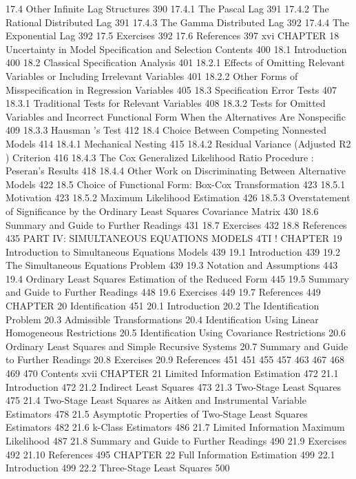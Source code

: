{17.4 Other Infinite Lag Structures 390
17.4.1 The Pascal Lag 391
17.4.2 The Rational Distributed Lag 391
17.4.3 The Gamma Distributed Lag 392
17.4.4 The Exponential Lag 392
17.5 Exercises 392
17.6 References 397
xvi
CHAPTER 18
Uncertainty in Model Specification and Selection
Contents
400
18.1 Introduction 400
18.2 Classical Specification Analysis 401
18.2.1 Effects of Omitting Relevant Variables or Including Irrelevant Variables 401
18.2.2 Other Forms of Misspecification in Regression Variables 405
18.3 Specification Error Tests 407
18.3.1 Traditional Tests for Relevant Variables 408
18.3.2 Tests for Omitted Variables and Incorrect Functional Form When the
Alternatives Are Nonspecific 409
18.3.3 Hausman 's Test 412
18.4 Choice Between Competing Nonnested Models 414
18.4.1 Mechanical Nesting 415
18.4.2 Residual Variance (Adjusted R2 ) Criterion 416
18.4.3 The Cox Generalized Likelihood Ratio Procedure : Peseran's Results 418
18.4.4 Other Work on Discriminating Between Alternative Models 422
18.5 Choice of Functional Form: Box-Cox Transformation 423
18.5.1 Motivation 423
18.5.2 Maximum Likelihood Estimation 426
18.5.3 Overstatement of Significance by the Ordinary Least Squares
Covariance Matrix 430
18.6 Summary and Guide to Further Readings 431
18.7 Exercises 432
18.8 References 435
PART IV: SIMULTANEOUS EQUATIONS
MODELS 4TI !
CHAPTER 19
Introduction to Simultaneous Equations Models 439
19.1 Introduction 439
19.2 The Simultaneous Equations Problem 439
19.3 Notation and Assumptions 443
19.4 Ordinary Least Squares Estimation of the Reduced Form 445
19.5 Summary and Guide to Further Readings 448
19.6 Exercises 449
19.7 References 449
CHAPTER 20
Identification 451
20.1 Introduction
20.2 The Identification Problem
20.3 Admissible Transformations
20.4 Identification Using Linear Homogeneous Restrictions
20.5 Identification Using Covariance Restrictions
20.6 Ordinary Least Squares and Simple Recursive Systems
20.7 Summary and Guide to Further Readings
20.8 Exercises
20.9 References
451
451
455
457
463
467
468
469
470
Contents xvii
CHAPTER 21
Limited Information Estimation 472
21.1 Introduction 472
21.2 Indirect Least Squares 473
21.3 Two-Stage Least Squares 475
21.4 Two-Stage Least Squares as Aitken and Instrumental Variable Estimators 478
21.5 Asymptotic Properties of Two-Stage Least Squares Estimators 482
21.6 k-Class Estimators 486
21.7 Limited Information Maximum Likelihood 487
21.8 Summary and Guide to Further Readings 490
21.9 Exercises 492
21.10 References 495
CHAPTER 22
Full Information Estimation 499
22.1 Introduction 499
22.2 Three-Stage Least Squares 500
}
